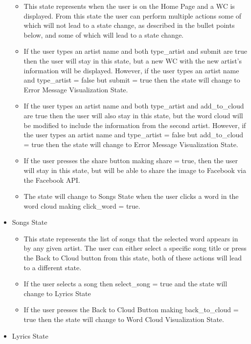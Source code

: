 \documentclass[]{article}
\begin{document}
\begin{itemize}
  \begin{itemize}
  \itemsep1pt\parskip0pt
  \item
    This state represents when the user is on the Home Page and a WC is
    displayed. From this state the user can perform multiple actions
    some of which will not lead to a state change, as described in the
    bullet points below, and some of which will lead to a state change.
  \item
    If the user types an artist name and both type\_artist and submit
    are true then the user will stay in this state, but a new WC with
    the new artist's information will be displayed. However, if the user
    types an artist name and type\_artist = false but submit = true then
    the state will change to Error Message Visualization State.
  \item
    If the user types an artist name and both type\_artist and
    add\_to\_cloud are true then the user will also stay in this state,
    but the word cloud will be modified to include the information from
    the second artist. However, if the user types an artist name and
    type\_artist = false but add\_to\_cloud = true then the state will
    change to Error Message Visualization State.
  \item
    If the user presses the share button making share = true, then the
    user will stay in this state, but will be able to share the image to
    Facebook via the Facebook API.
  \item
    The state will change to Songs State when the user clicks a word in
    the word cloud making click\_word = true.
  \end{itemize}
\item
  Songs State

  \begin{itemize}
  \itemsep1pt\parskip0pt
  \item
    This state represents the list of songs that the selected word
    appears in by any given artist. The user can either select a
    specific song title or press the Back to Cloud button from this
    state, both of these actions will lead to a different state.
  \item
    If the user selects a song then select\_song = true and the state
    will change to Lyrics State
  \item
    If the user presses the Back to Cloud Button making back\_to\_cloud
    = true then the state will change to Word Cloud Visualization State.
  \end{itemize}
\item
  Lyrics State


\end{itemize}
\end{document}
